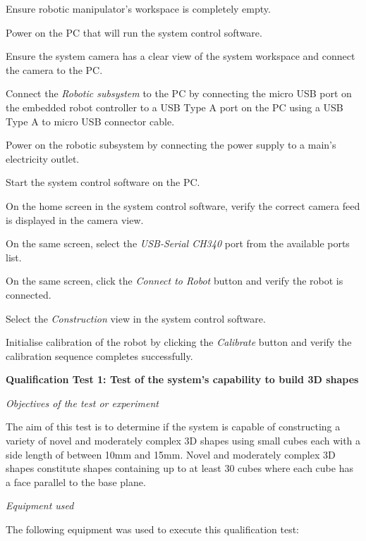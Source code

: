 \begin{compactenum}
	\item Ensure robotic manipulator's workspace is completely empty.
	\item Power on the PC that will run the system control software.
	\item Ensure the system camera has a clear view of the system workspace and connect the camera to the PC.
	\item Connect the \textit{Robotic subsystem} to the PC by connecting the micro USB port on the embedded robot controller to a USB Type A port on the PC using a USB Type A to micro USB connector cable.
	\item Power on the robotic subsystem by connecting the power supply to a main's electricity outlet.
	\item Start the system control software on the PC.
	\item On the home screen in the system control software, verify the correct camera feed is displayed in the camera view.
	\item On the same screen, select the \textit{USB-Serial CH340} port from the available ports list.
	\item On the same screen, click the \textit{Connect to Robot} button and verify the robot is connected.
	\item Select the \textit{Construction} view in the system control software.
	\item Initialise calibration of the robot by clicking the \textit{Calibrate} button and verify the calibration sequence completes successfully.
\end{compactenum}

\textbf{Qualification Test 1: Test of the system's capability to build 3D shapes}

\textit{Objectives of the test or experiment}

The aim of this test is to determine if the system is capable of constructing a variety of novel and moderately complex 3D shapes using small cubes each with a side length of between 10mm and 15mm. Novel and moderately complex 3D shapes constitute shapes containing up to at least 30 cubes where each cube has a face parallel to the base plane.

\textit{Equipment used}

The following equipment was used to execute this qualification test:

